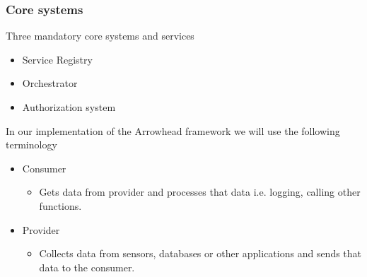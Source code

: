 \begin{frame}
    \frametitle{Core systems}
    Three mandatory core systems and services
        \begin{itemize}
            \item Service Registry
            \item Orchestrator
            \item Authorization system
        \end{itemize}
    In our implementation of the Arrowhead framework we will use the following terminology
        \begin{itemize}
            \item Consumer
                \begin{itemize}
                    \item Gets data from provider and processes that data i.e. logging, calling other functions.
                \end{itemize}
            \item Provider
                \begin{itemize}
                    \item Collects data from sensors, databases or other applications and sends that data to the consumer.
                \end{itemize}
        \end{itemize}
\end{frame}